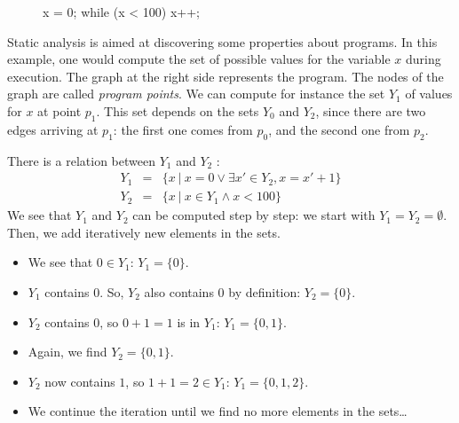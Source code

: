 \documentclass[a4paper,english,titlepage,11pt]{report}
\begin{document}
\begin{figure}[!h]
   \begin{minipage}[c]{.46\linewidth}
\begin{C}
x = 0;
while (x < 100) {
	x++;
}
\end{C}
   \end{minipage} \hfill
   \begin{minipage}[c]{.46\linewidth}
   \end{minipage}
\end{figure}
\FloatBarrier

Static analysis is aimed at discovering some properties about programs. In this
example, one would compute the set of possible values for the variable $x$
during execution.
The graph at the right side represents the program. The nodes of the graph are
called \emph{program points}. We can compute for instance the set $Y_1$ of
values for $x$ at point $p_1$. This set depends on the sets $Y_0$ and $Y_2$,
since there are two edges arriving at $p_1$: the first one comes from $p_0$, and
the second one from $p_2$.

There is a relation between $Y_1$ and $Y_2$ :
\begin{eqnarray*}
Y_1 &=& \{x\ |\ x=0 \vee \exists x' \in Y_2, x=x'+1 \} \\
Y_2 &=& \{x\ |\ x \in Y_1 \wedge x < 100 \}
\end{eqnarray*}
We see that $Y_1$ and $Y_2$ can be computed step by step:
we start with $Y_1 = Y_2 = \emptyset$.
Then, we add iteratively new elements in the sets.
\begin{itemize}
\item  We see that $0 \in Y_1$: $Y_1 = \{0\}$.
\item $Y_1$ contains $0$. So, $Y_2$ also contains $0$ by definition: $Y_2 =
\{0\}$.
\item $Y_2$ contains $0$, so $0+1=1$ is in $Y_1$: $Y_1 = \{0,1\}$.
\item Again, we find $Y_2 = \{0,1\}$.
\item $Y_2$ now contains $1$, so $1+1=2 \in Y_1$: $Y_1 = \{0,1,2\}$.
\item We continue the iteration until we find no more elements in the sets\dots
\end{itemize}
\end{document}
